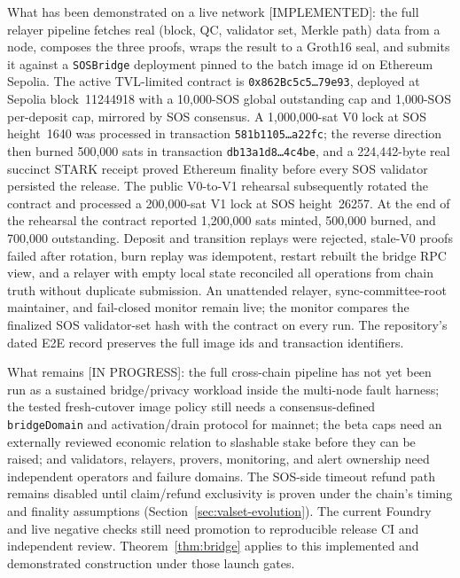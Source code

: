 \documentclass[11pt]{article}
\newcommand{\code}[1]{\texttt{#1}}
\newcommand{\statusI}{\textcolor{statgreen}{\textsf{\scriptsize[IMPLEMENTED]}}}
\newcommand{\statusP}{\textcolor{statblue}{\textsf{\scriptsize[IN PROGRESS]}}}
\theoremstyle{plain}
\theoremstyle{definition}
\theoremstyle{remark}
\begin{document}
What has been demonstrated on a live network \statusI{}: the full relayer
pipeline fetches real (block, QC, validator set, Merkle path) data from a node,
composes the three proofs, wraps the result to a Groth16 seal, and submits it
against a \code{SOSBridge} deployment pinned to the batch image id on Ethereum
Sepolia. The active TVL-limited contract is
\code{0x862Bc5c5\ldots 79e93}, deployed at Sepolia block~11244918 with a
10,000-SOS global outstanding cap and 1,000-SOS per-deposit cap, mirrored by
SOS consensus. A 1,000,000-sat V0 lock at SOS height~1640 was processed in
transaction \code{581b1105\ldots a22fc}; the reverse direction then burned
500,000 sats in transaction \code{db13a1d8\ldots 4c4be}, and a 224,442-byte
real succinct STARK receipt proved Ethereum finality before every SOS validator
persisted the release. The public V0-to-V1 rehearsal subsequently rotated the
contract and processed a 200,000-sat V1 lock at SOS height~26257. At the end of
the rehearsal the contract reported 1,200,000 sats minted, 500,000 burned, and
700,000 outstanding. Deposit and transition replays were rejected, stale-V0
proofs failed after rotation, burn replay was idempotent, restart rebuilt the
bridge RPC view, and a relayer with empty local state reconciled all operations
from chain truth without duplicate submission. An unattended relayer,
sync-committee-root maintainer, and fail-closed monitor remain live; the monitor
compares the finalized SOS validator-set hash with the contract on every run.
The repository's dated E2E record preserves the full image ids and transaction
identifiers.

What remains \statusP{}: the full cross-chain pipeline has not yet been run as
a sustained bridge/privacy workload inside the multi-node fault harness; the
tested fresh-cutover image policy still needs a consensus-defined
\code{bridgeDomain} and activation/drain protocol for mainnet; the beta caps
need an externally reviewed economic relation to slashable stake before they
can be raised; and validators, relayers, provers, monitoring, and alert ownership
need independent operators and failure domains. The SOS-side timeout refund
path remains disabled until claim/refund exclusivity is proven under the
chain's timing and finality assumptions
(Section~\ref{sec:valset-evolution}). The current Foundry and live negative
checks still need promotion to reproducible release CI and independent review.
Theorem~\ref{thm:bridge} applies to this implemented and demonstrated
construction under those launch gates.

\end{document}
